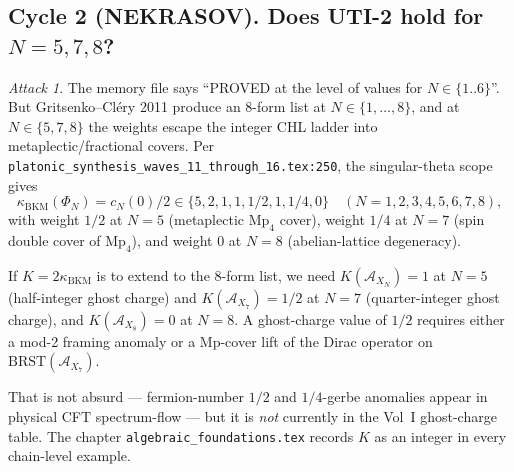 \documentclass[11pt]{amsart}
\theoremstyle{definition}
\theoremstyle{remark}
\newtheorem{attack}[theorem]{Attack}
\newcommand{\kBKM}{\kappa_{\mathrm{BKM}}}
\newcommand{\BRST}{\mathrm{BRST}}
\begin{document}
\subsection{Cycle 2 (NEKRASOV). Does UTI-2 hold for $N = 5, 7, 8$?}

\begin{attack}
The memory file says ``PROVED at the level of values for $N \in \{1..6\}$''. But Gritsenko--Cl\'ery
2011 produce an 8-form list at $N \in \{1, \ldots, 8\}$, and at $N \in \{5, 7, 8\}$ the weights
escape the integer CHL ladder into metaplectic/fractional covers. Per
\texttt{platonic\_synthesis\_waves\_11\_through\_16.tex:250}, the singular-theta scope gives
\[
\kBKM(\Phi_N) = c_N(0)/2 \in \{5, 2, 1, 1, 1/2, 1, 1/4, 0\}
\quad (N = 1, 2, 3, 4, 5, 6, 7, 8),
\]
with weight $1/2$ at $N = 5$ (metaplectic $\mathrm{Mp}_4$ cover), weight $1/4$ at $N = 7$ (spin
double cover of $\mathrm{Mp}_4$), and weight $0$ at $N = 8$ (abelian-lattice degeneracy).

If $K = 2\kBKM$ is to extend to the 8-form list, we need $K(\mathcal{A}_{X_N}) = 1$ at $N = 5$
(half-integer ghost charge) and $K(\mathcal{A}_{X_7}) = 1/2$ at $N = 7$ (quarter-integer ghost charge),
and $K(\mathcal{A}_{X_8}) = 0$ at $N = 8$. A ghost-charge value of $1/2$ requires either a mod-2
framing anomaly or a $\mathrm{Mp}$-cover lift of the Dirac operator on $\BRST(\mathcal{A}_{X_7})$.

That is not absurd --- fermion-number $1/2$ and $1/4$-gerbe anomalies appear in physical
CFT spectrum-flow --- but it is \emph{not} currently in the Vol~I ghost-charge table. The chapter
\texttt{algebraic\_foundations.tex} records $K$ as an integer in every chain-level example.
\end{attack}
\end{document}
